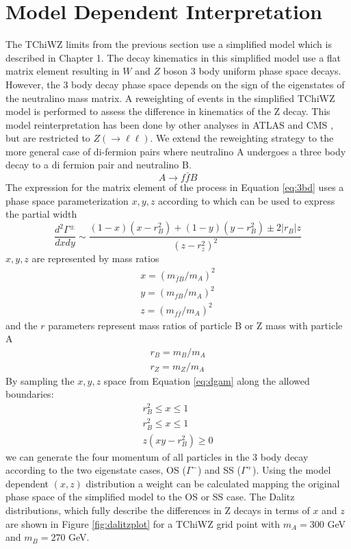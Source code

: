 \section{Model Dependent Interpretation}
The TChiWZ limits from the previous section use a simplified model which is described in Chapter 1. The decay kinematics in this simplified model  use a flat matrix element resulting in $W$ and $Z$ boson 3 body uniform phase space decays. However, the 3 body decay phase space depends on the sign of the eigenstates of the neutralino mass matrix. A reweighting of events in the simplified TChiWZ model is performed to assess the difference in kinematics of the Z decay. This model reinterpretation has been done by other analyses in ATLAS and CMS \cite{CMS:2021edw}\cite{ATLAS:2019lng}, but are restricted to $Z(\rightarrow \ell\ell)$. We extend the reweighting strategy to the more general case of di-fermion pairs where neutralino A undergoes a three body decay to a di fermion pair and neutralino B. 
\begin{equation}
\label{eq:3bd}
A \rightarrow f \bar{f} B
\end{equation}
The expression for the matrix element of the process in Equation \ref{eq:3bd} uses a phase space parameterization $x,y,z$ according to \cite{Nojiri:1999ki} which can be used to express the partial width 
\begin{equation}
\label{eq:dgam}
\frac{d^2\Gamma^\pm}{dxdy}\sim \frac{(1-x)(x-r_B^2)+(1-y)(y-r_B^2)\pm 2|r_B|z}{(z-r_z^2)^2}
\end{equation}
$x,y,z$ are represented by mass ratios
\begin{equation}
\begin{split}
x=(m_{\bar{f}B}/m_A)^2 \\
y=(m_{fB}/m_A)^2 \\
z=(m_{f\bar{f}}/m_A)^2 
\end{split}
\end{equation} 
and the $r$ parameters represent mass ratios of particle B or Z mass with particle A
\begin{equation}
\begin{split}
r_B = m_B/m_A \\
r_Z = m_Z/m_A 
\end{split}
\end{equation}
By sampling the $x,y,z$ space from Equation \ref{eq:dgam} along the allowed boundaries:
\begin{equation}
\begin{split}
r_B^2 \leq x \leq 1 \\
r_B^2 \leq x \leq 1 \\
z(xy-r_B^2) \geq 0
\end{split}
\end{equation}
we can generate the four momentum of all particles in the 3 body decay according to the two eigenstate cases, OS ($\Gamma^-$) and SS ($\Gamma^+$). Using the model dependent $(x,z)$ distribution a weight can be calculated mapping the original phase space of the simplified model to the OS or SS case. The  Dalitz distributions, which fully describe the differences in Z decays in terms of $x$ and $z$ are shown in Figure \ref{fig:dalitzplot} for a TChiWZ grid point with $m_A = 300$ GeV and $m_B= 270$ GeV.

